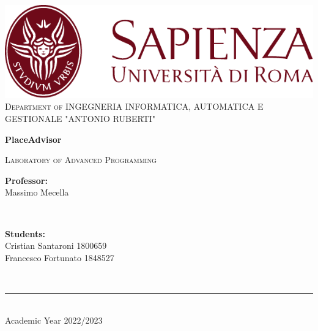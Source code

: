 \begin{titlepage}
	\centering
    \vspace*{0.5 cm}
    \includegraphics[scale = 0.75]{figures/SapienzaLogo.pdf}\\[1.0 cm]	%

    \vspace*{-0.4cm}
    \textsc{\large Department of INGEGNERIA INFORMATICA, AUTOMATICA E GESTIONALE "ANTONIO RUBERTI"}\\[2.0 cm]	%
    \vspace*{1cm}

    { \fontsize{20.74pt}{18.5pt}\selectfont\bfseries PlaceAdvisor \par } %

    \vspace*{0.25cm}
    \textsc{\Large Laboratory of Advanced Programming}\\[0.5 cm] %

    \vspace*{2.6cm}
	\begin{minipage}{0.4\textwidth} %
		\begin{flushleft} \large
			\textbf{Professor:}\\
			Massimo Mecella\\
		\end{flushleft}
	\end{minipage}~
	\begin{minipage}{0.3\textwidth} %
		\begin{flushright} \large
		\begin{minipage}{2\textwidth}
		\begin{flushleft} \large
			\textbf{Students:} \\
              Cristian Santaroni 1800659\\
			 Francesco Fortunato 1848527
			 
        \end{flushleft}
        \end{minipage}
		\end{flushright}
	\end{minipage}\\[3.85 cm]

    \vspace{2cm}
    \rule{\linewidth}{0.2 mm} \\[0.3 cm]
    \vspace*{-0.2cm}
    Academic Year 2022/2023
\end{titlepage}